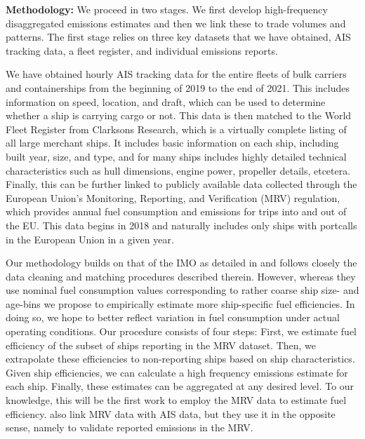 \documentclass[hidelinks, 12pt,letterpaper]{article}
\begin{document}
\smallskip

\noindent \textbf{Methodology:} We proceed in two stages. We first develop high-frequency disaggregated emissions estimates and then we link these to trade volumes and patterns. The first stage relies on three key datasets that we have obtained, AIS tracking data, a fleet register, and individual emissions reports.

We have obtained hourly AIS tracking data for the entire fleets of bulk carriers and containerships from the beginning of 2019 to the end of 2021. This includes information on speed, location, and draft, which can be used to determine whether a ship is carrying cargo or not. This data is then matched to the World Fleet Register from Clarksons Research, which is a virtually complete listing of all large merchant ships. It includes basic  information on each ship, including built year, size, and type, and for many ships includes highly detailed technical characteristics such as hull dimensions, engine power, propeller details, etcetera. Finally, this can be further linked to publicly available data collected through the European Union's Monitoring, Reporting, and Verification (MRV) regulation, which provides annual fuel consumption and emissions for trips into and out of the EU. This data begins in 2018 and naturally includes only ships with portcalls in the European Union in a given year.

Our methodology builds on that of the IMO as detailed in \citet{faber2020fourth} and follows closely the data cleaning and matching procedures described therein. However, whereas they use nominal fuel consumption values corresponding to rather coarse ship size- and age-bins we propose to empirically estimate more ship-specific fuel efficiencies. In doing so, we hope to better reflect variation in fuel consumption under actual operating conditions. Our procedure consists of four steps: First, we estimate fuel efficiency of the subset of ships reporting in the MRV dataset. Then, we extrapolate these efficiencies to non-reporting ships based on ship characteristics. Given ship efficiencies, we can calculate a high frequency emissions estimate for each ship. Finally, these estimates can be aggregated at any desired level. To our knowledge, this will be the first work to employ the MRV data to estimate fuel efficiency. \citet{uge2020estimation} also link MRV data with AIS data, but they use it in the opposite sense, namely to validate reported emissions in the MRV.
\end{document}
